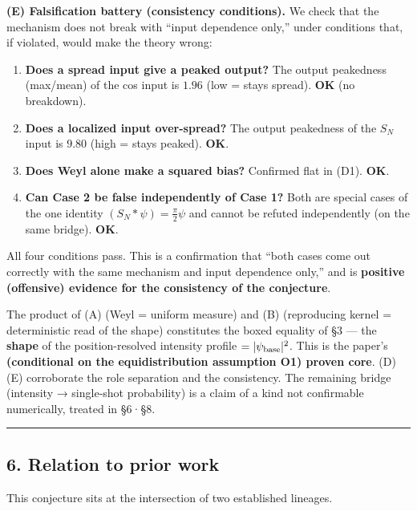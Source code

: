 \documentclass[
]{ltjsarticle}
\providecommand{\tightlist}{%
  \setlength{\itemsep}{0pt}\setlength{\parskip}{0pt}}
\begin{document}
\textbf{(E) Falsification battery (consistency conditions).} We check
that the mechanism does not break with ``input dependence only,'' under
conditions that, if violated, would make the theory wrong:

\begin{enumerate}
\def\labelenumi{\arabic{enumi}.}
\tightlist
\item
  \textbf{Does a spread input give a peaked output?} The output
  peakedness (max/mean) of the cos input is \(1.96\) (low = stays
  spread). \textbf{OK} (no breakdown).
\item
  \textbf{Does a localized input over-spread?} The output peakedness of
  the \(S_N\) input is \(9.80\) (high = stays peaked). \textbf{OK}.
\item
  \textbf{Does Weyl alone make a squared bias?} Confirmed flat in (D1).
  \textbf{OK}.
\item
  \textbf{Can Case 2 be false independently of Case 1?} Both are special
  cases of the one identity \((S_N*\psi)=\tfrac{\pi}{2}\psi\) and cannot
  be refuted independently (on the same bridge). \textbf{OK}.
\end{enumerate}

All four conditions pass. This is a confirmation that ``both cases come
out correctly with the same mechanism and input dependence only,'' and
is \textbf{positive (offensive) evidence for the consistency of the
conjecture}.

The product of (A) (Weyl = uniform measure) and (B) (reproducing kernel
= deterministic read of the shape) constitutes the boxed equality of §3
--- the \textbf{shape} of the position-resolved intensity profile
\(=|\psi_{\rm base}|^2\). This is the paper's \textbf{(conditional on
the equidistribution assumption O1) proven core}. (D)(E) corroborate the
role separation and the consistency. The remaining bridge (intensity →
single-shot probability) is a claim of a kind not confirmable
numerically, treated in §6·§8.

\begin{center}\rule{0.5\linewidth}{0.5pt}\end{center}

\subsection{6. Relation to prior work}\label{relation-to-prior-work}

This conjecture sits at the intersection of two established lineages.
\end{document}
